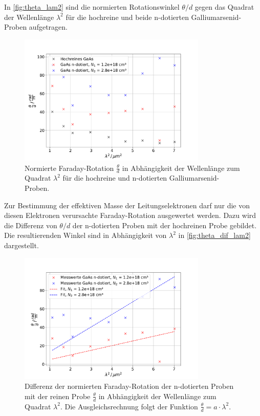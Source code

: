 In \autoref{fig:theta_lam2} sind die normierten Rotationswinkel $\theta / d$ gegen das Quadrat der Wellenlänge $\lambda^2$ für die hochreine und beide n-dotierten Galliumarsenid-Proben aufgetragen.
\begin{figure}
    \centering
    \includegraphics[width=0.8\textwidth]{figure/theta_lam2.pdf}
    \caption{Normierte Faraday-Rotation $\frac{\theta}{d}$ in Abhängigkeit der Wellenlänge zum Quadrat $\lambda^2$ für die hochreine und n-dotierten Galliumarsenid-Proben.}
    \label{fig:theta_lam2}
\end{figure}
Zur Bestimmung der effektiven Masse der Leitungselektronen darf nur die von diesen Elektronen verursachte Faraday-Rotation ausgewertet werden.
Dazu wird die Differenz von $\theta / d$ der n-dotierten Proben mit der hochreinen Probe gebildet.
Die resultierenden Winkel sind in Abhängigkeit von $\lambda^2$ in \autoref{fig:theta_dif_lam2} dargestellt.
\begin{figure}
    \centering
    \includegraphics[width=0.8\textwidth]{figure/theta_lam2_dif.pdf}
    \caption{Differenz der normierten Faraday-Rotation der n-dotierten Proben mit der reinen Probe $\frac{\theta}{d}$ in Abhängigkeit der Wellenlänge zum Quadrat $\lambda^2$.
    Die Ausgleichsrechnung folgt der Funktion $\frac{\theta}{d} = a\cdot \lambda^2$.
    }
    \label{fig:theta_dif_lam2}
\end{figure}
